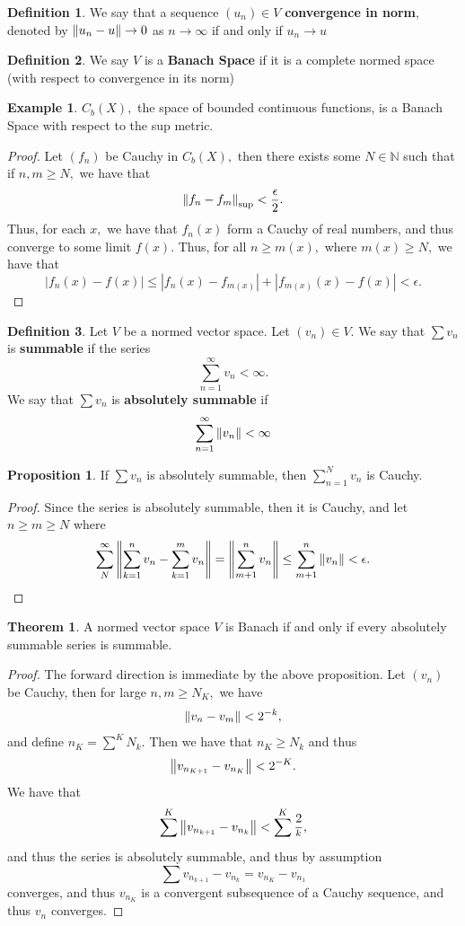 \documentclass[10pt, oneside]{article}
\newcommand{\bbN}{\mathbb{N}}
\theoremstyle{definition}
\newtheorem{exmp}{Example}[section]
\newtheorem{thm}{Theorem}
\newtheorem{defn}{Definition}
\newtheorem{prop}{Proposition}
\begin{document}
\begin{defn}
    We say that a sequence $(u_n)\in V$ \textbf{convergence in norm}, denoted by $\norm{u_n - u}\to 0$ as $n\to \infty$ if and only if $u_n \to u$ 
\end{defn}
\begin{defn}
    We say $V$ is a \textbf{Banach Space} if it is a complete normed space (with respect to convergence in its norm)
\end{defn}
\begin{exmp}
    $C_b(X),$ the space of bounded continuous functions, is a Banach Space with respect to the sup metric. 
    \begin{proof}
    Let $(f_n)$ be Cauchy in $C_b(X),$ then there exists some $N\in \bbN$ such that if $n,m \geq N,$  we have that
    \[\norm{f_{n}- f_{m}}_{\sup} < \frac{\epsilon}{2}.\] Thus, for each $x,$ we have that $f_n(x)$ form a Cauchy of real numbers, and thus converge to some limit $f(x).$ Thus, for all $n\geq m(x),$ where $m(x)\geq N,$ we have that 
    \[|f_n(x) - f(x)|\leq |f_n(x) - f_{m(x)}| + |f_{m(x)}(x) - f(x)| < \epsilon.\]
    \end{proof}
\end{exmp}
\begin{defn}
    Let $V$ be a normed vector space. Let $(v_n)\in V.$ We say that $\sum v_n$ is \textbf{summable} if the series \[\sum_{n=1}^\infty v_n < \infty.\] We say that $\sum v_n$ is \textbf{absolutely summable} if 
    \[\sum_{n=1}^\infty \norm{v_n} < \infty\]
\end{defn}
\begin{prop}
    If $\sum v_n$ is absolutely summable, then $\sum_{n=1}^N v_n$ is Cauchy.
\end{prop}
\begin{proof}
Since the series is absolutely summable, then it is Cauchy, and let $n \geq m \geq N$ where \[\sum_{N}^\infty 
    \norm{\sum_{k=1}^n v_n - \sum_{k=1}^m v_n} = \norm{\sum_{m+1}^n v_n} \leq \sum_{m+1}^n \norm{v_n} < \epsilon.\]
\end{proof}
\begin{thm}
    A normed vector space $V$ is Banach if and only if every absolutely summable series is summable.
\end{thm}
\begin{proof}
    The forward direction is immediate by the above proposition. Let $(v_n)$ be Cauchy, then for large $n, m \geq N_K,$ we have 
    \[\norm{v_n - v_m} < 2^{-k},\] and define $n_K = \sum^K N_k.$ Then we have that $n_K \geq N_k$ and thus 
    \[\norm{v_{n_{K+1}} - v_{n_K}} < 2^{-K}.\] We have that 
    \[\sum^K \norm{v_{n_{k+1}} - v_{n_k}} < \sum^K \frac{2}{^k},\] and thus the series is absolutely summable, and thus by assumption 
    \[\sum v_{n_{k+1}} - v_{n_k} = v_{n_K} - v_{n_1}\] converges, and thus $v_{n_K}$ is a convergent subsequence of a Cauchy sequence, and thus $v_n$ converges.
\end{proof}
\newpage
\end{document}
